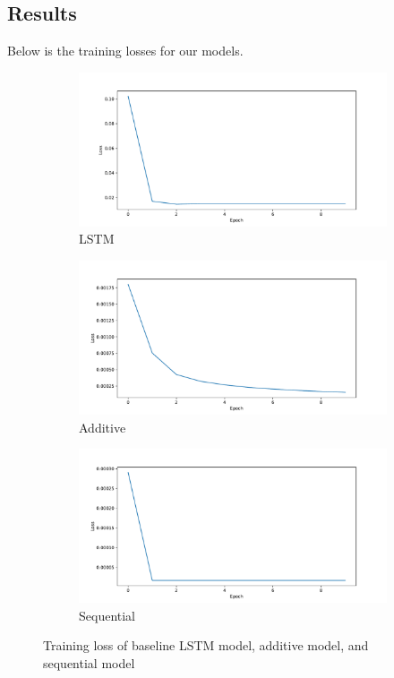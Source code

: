 \subsection{Results}

Below is the training losses for our models.

\begin{figure}[H]
	\centering
	\begin{subfigure}{0.32\linewidth}
		\includegraphics[width=\linewidth]{../../figures/vanilla_lstm_training_loss.pdf}
		\caption{LSTM}
	\end{subfigure}
	\begin{subfigure}{0.32\linewidth}
		\includegraphics[width=\linewidth]{../../figures/additive_model_training_loss.pdf}
		\caption{Additive}
	\end{subfigure}
	\begin{subfigure}{0.32\linewidth}
		\includegraphics[width=\linewidth]{../../figures/sequential_model_training_loss.pdf}
		\caption{Sequential}
	\end{subfigure}
	\caption{Training loss of baseline LSTM model, additive model, and sequential model}
	\label{fig:lstm_loss}
\end{figure}

